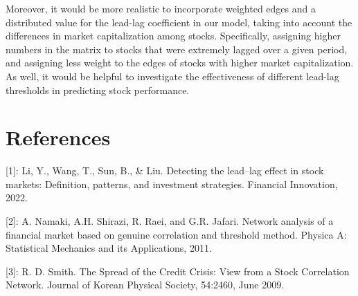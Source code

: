 \documentclass{article}
\begin{document}
Moreover, it would be more realistic to incorporate weighted edges and a distributed value for the lead-lag coefficient in our model, taking into account the differences in market capitalization among stocks. Specifically, assigning higher numbers in the matrix to stocks that were extremely lagged over a given period, and assigning less weight to the edges of stocks with higher market capitalization. As well, it would be helpful to investigate the effectiveness of different lead-lag thresholds in predicting stock performance.

\section*{References}
[1]: Li, Y., Wang, T., Sun, B., \& Liu. Detecting the lead–lag effect in stock markets: Definition, patterns, and investment strategies. Financial Innovation, 2022.

[2]: A. Namaki, A.H. Shirazi, R. Raei, and G.R. Jafari. Network analysis of a financial market based on genuine correlation and threshold method. Physica A: Statistical
Mechanics and its Applications, 2011.

[3]: R. D. Smith. The Spread of the Credit Crisis: View
from a Stock Correlation Network. Journal of Korean
Physical Society, 54:2460, June 2009.

\medskip
\small
\end{document}

